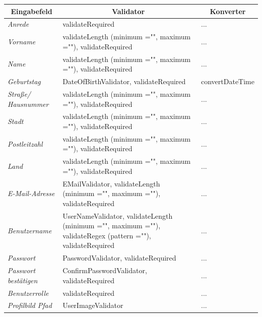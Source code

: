 \begin{itemize}
\begin{center}
\begin{longtable}{|p{3cm} |p{8cm} | p{5cm}|}
						\hline \multicolumn{1}{|c|}{\textbf{Eingabefeld}} & \multicolumn{1}{|c|}{\textbf{Validator}} & \multicolumn{1}{|c|}{\textbf{Konverter}} \\ \hline
						\endfirsthead
						\hline
						\endlastfoot
						\textit{Anrede} & validateRequired & ... \\ \hline
						\textit{Vorname} & validateLength (minimum ="", maximum =""), validateRequired & ... \\ \hline
						\textit{Name} & validateLength (minimum ="", maximum =""), validateRequired & ...  \\ \hline
						\textit{Geburtstag} & DateOfBirthValidator, validateRequired & convertDateTime  \\ \hline
						\textit{Straße/ Hausnummer} & validateLength (minimum ="", maximum =""), validateRequired & ... \\ \hline
						\textit{Stadt} & validateLength (minimum ="", maximum =""), validateRequired & ...  \\ \hline
						\textit{Postleitzahl} & validateLength (minimum ="", maximum =""), validateRequired & ... \\ \hline
						\textit{Land} & validateLength (minimum ="", maximum =""), validateRequired & ...  \\ \hline
						\textit{E-Mail-Adresse} & EMailValidator, validateLength (minimum ="", maximum =""), validateRequired & ... \\ \hline
						\textit{Benutzername} & UserNameValidator, validateLength (minimum ="", maximum =""), validateRegex (pattern =""), validateRequired  & ... \\ \hline
						\textit{Passwort} & PasswordValidator, validateRequired & ...  \\ \hline
						\textit{Passwort bestätigen} & ConfirmPasswordValidator, validateRequired & ... \\ \hline
						\textit{Benutzerrolle} & validateRequired & ... \\ \hline
						\textit{Profilbild Pfad} & UserImageValidator & ... \\ \hline
					\end{longtable}
				\end{center}
				

\end{itemize}
